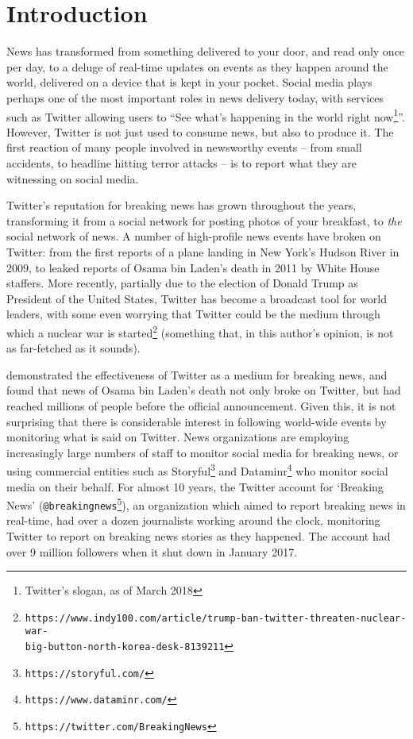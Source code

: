 
\newpage
\chapter{Introduction}
\label{chapter:introduction}
News has transformed from something delivered to your door, and read only once per day, to a deluge of real-time updates on events as they happen around the world, delivered on a device that is kept in your pocket.
Social media plays perhaps one of the most important roles in news delivery today, with services such as Twitter allowing users to ``See what’s happening in the world right now\footnote{Twitter's slogan, as of March 2018}''.
However, Twitter is not just used to consume news, but also to produce it.
The first reaction of many people involved in newsworthy events -- from small accidents, to headline hitting terror attacks -- is to report what they are witnessing on social media.

Twitter's reputation for breaking news has grown throughout the years, transforming it from a social network for posting photos of your breakfast, to \emph{the} social network of news.
A number of high-profile news events have broken on Twitter: from the first reports of a plane landing in New York's Hudson River in 2009, to leaked reports of Osama bin Laden's death in 2011 by White House staffers.
More recently, partially due to the election of Donald Trump as President of the United States, Twitter has become a broadcast tool for world leaders, with some even worrying that Twitter could be the medium through which a nuclear war is started\footnote{\texttt{https://www.indy100.com/article/trump-ban-twitter-threaten-nuclear-war-\\big-button-north-korea-desk-8139211}} (something that, in this author's opinion, is not as far-fetched as it sounds).

\cite{Hu:2012:BNT:2208636.2208672} demonstrated the effectiveness of Twitter as a medium for breaking news, and found that news of Osama bin Laden's death not only broke on Twitter, but had reached millions of people before the official announcement.
Given this, it is not surprising that there is considerable interest in following world-wide events by monitoring what is said on Twitter.
News organizations are employing increasingly large numbers of staff to monitor social media for breaking news, or using commercial entities such as Storyful\footnote{\texttt{https://storyful.com/}} and Dataminr\footnote{\texttt{https://www.dataminr.com/}} who monitor social media on their behalf.
For almost 10 years, the Twitter account for `Breaking News' (\texttt{@breakingnews}\footnote{\texttt{https://twitter.com/BreakingNews}}), an organization which aimed to report breaking news in real-time, had over a dozen journalists working around the clock, monitoring Twitter to report on breaking news stories as they happened. The account had over 9 million followers when it shut down in January 2017.

